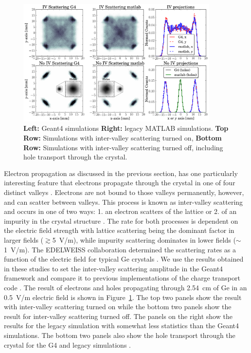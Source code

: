 
\begin{figure}
	\centering
		\includegraphics[width=0.9\textwidth]{intervalley.png}
	\caption{\textbf{Left:} Geant4 simulations \textbf{Right:} legacy MATLAB simulations. \textbf{Top Row:} Simulations with inter-valley scattering turned on, \textbf{Bottom Row:} Simulations with inter-valley scattering turned off, including hole transport through the crystal.}
	\label{fig:intervalley}
\end{figure}

Electron propagation as discussed in the previous section, has one particularly interesting feature that electrons propagate through the crystal in one of four distinct valleys \cite{Cabrera,Leman}. Electrons are not bound to those valleys permanently, however, and can scatter between valleys. This process is known as inter-valley scattering and occurs in one of two ways: 1. an electron scatters of the lattice or 2. of an impurity in the crystal structure \cite{iv}. The rate for both processes is dependent on the electric field strength with lattice scattering being the dominant factor in larger fields ($\gtrsim$5~V/m), while impurity scattering dominates in lower fields ($\sim$1~V/m). The EDELWEISS \cite{edelweiss} collaboration determined the scattering rates as a function of the electric field for typical Ge crystals \cite{iv}. We use the results obtained in these studies to set the inter-valley scattering amplitude in the Geant4 framework and compare it to previous implementations of the charge transport 
code \cite{Cabrera,Leman}. The result of electrons and holes propagating through 2.54~cm of Ge in an 0.5~V/m electric field is shown in Figure~\ref{fig:intervalley}. The top two panels show the result with inter-valley scattering turned on while the bottom two panels show the result for inter-valley scattering turned off. The panels on the right show the results for the legacy simulation \cite{Cabrera,Leman} with somewhat less statistics than the Geant4 simulations. The bottom two panels also show the hole transport through the crystal for the G4 and legacy simulations \cite{Cabrera,Leman}. 
